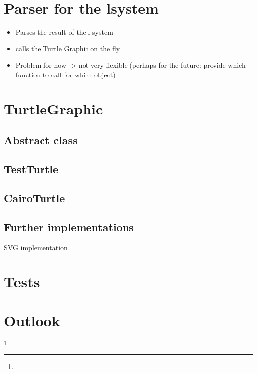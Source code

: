 \documentclass[english]{cpp-hmwk}
\begin{document}
\section{Parser for the lsystem}
\begin{itemize}
	\item Parses the result of the l system
	\item calls the Turtle Graphic on the fly
	
	\item Problem for now -> not very flexible (perhaps for the future: provide which function to call for which object)
\end{itemize}

\section{TurtleGraphic}
\subsection{Abstract class}
\subsection{TestTurtle}
\subsection{CairoTurtle}
\subsection{Further implementations}
SVG implementation
\section{Tests}
   \pagebreak
   \section{Outlook}
   \footnote{}
\end{document}
